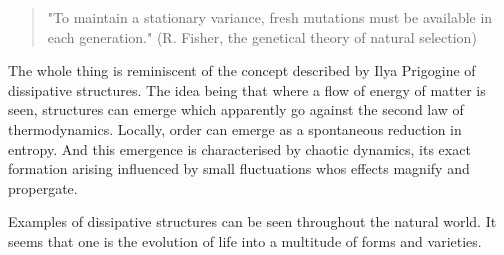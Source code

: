 \begin{quotation}
"To maintain a stationary variance, fresh mutations must be available in each generation." (R. Fisher, the genetical theory of natural selection)
\end{quotation}

The whole thing is reminiscent of the concept described by Ilya Prigogine of dissipative structures. The idea being that where a flow of energy of matter is seen, structures can emerge which apparently go against the second law of thermodynamics. Locally, order can emerge as a spontaneous reduction in entropy. And this emergence is characterised by chaotic dynamics, its exact formation arising influenced by small fluctuations whos effects magnify and propergate.\par
Examples of dissipative structures can be seen throughout the natural world. It seems that one is the evolution of life into a multitude of forms and varieties.
